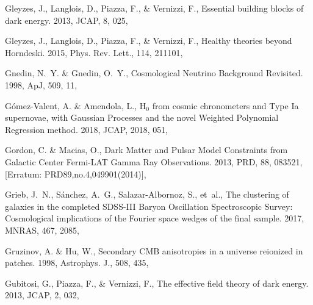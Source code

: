 \documentclass[longauth,traditabstract]{aa}
\def\apj{{ApJ}}
\def\mnras{{MNRAS}}
\def\prd{{PRD}}
\def\jcap{{JCAP}}
\begin{document}
\begin{thebibliography}{379}
{Gleyzes}, J., {Langlois}, D., {Piazza}, F., \& {Vernizzi}, F., {Essential
  building blocks of dark energy}. 2013, \jcap, 8, 025, 

Gleyzes, J., Langlois, D., Piazza, F., \& Vernizzi, F., {Healthy theories
  beyond Horndeski}. 2015, Phys. Rev. Lett., 114, 211101, 

{Gnedin}, N.~Y. \& {Gnedin}, O.~Y., {Cosmological Neutrino Background
  Revisited}. 1998, \apj, 509, 11, 

{G{\'o}mez-Valent}, A. \& {Amendola}, L., {H$_{0}$ from cosmic chronometers and
  Type Ia supernovae, with Gaussian Processes and the novel Weighted Polynomial
  Regression method}. 2018, \jcap, 2018, 051, 

Gordon, C. \& Macias, O., {Dark Matter and Pulsar Model Constraints from
  Galactic Center Fermi-LAT Gamma Ray Observations}. 2013, \prd, 88, 083521,
  [Erratum: PRD89,no.4,049901(2014)], 

{Grieb}, J.~N., {S{\'a}nchez}, A.~G., {Salazar-Albornoz}, S., {et~al.}, {The
  clustering of galaxies in the completed SDSS-III Baryon Oscillation
  Spectroscopic Survey: Cosmological implications of the Fourier space wedges
  of the final sample}. 2017, \mnras, 467, 2085, 

Gruzinov, A. \& Hu, W., {Secondary CMB anisotropies in a universe reionized in
  patches}. 1998, Astrophys. J., 508, 435, 

{Gubitosi}, G., {Piazza}, F., \& {Vernizzi}, F., {The effective field theory of
  dark energy}. 2013, \jcap, 2, 032, 


\end{thebibliography}
\end{document}
